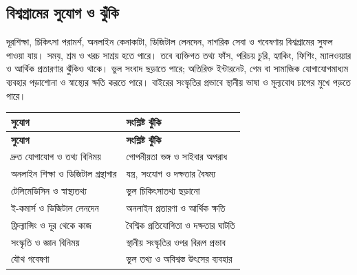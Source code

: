 \begin{topicbody}
\subsection{বিশ্বগ্রামের সুযোগ ও ঝুঁকি}
দূরশিক্ষা, চিকিৎসা পরামর্শ, অনলাইন কেনাকাটা, ডিজিটাল লেনদেন, নাগরিক সেবা ও গবেষণায় বিশ্বগ্রামের সুফল পাওয়া যায়। সময়, শ্রম ও খরচ সাশ্রয় হতে পারে। তবে ব্যক্তিগত তথ্য ফাঁস, পরিচয় চুরি, হ্যাকিং, ফিশিং, ম্যালওয়্যার ও আর্থিক প্রতারণার ঝুঁকিও থাকে। ভুল সংবাদ ছড়াতে পারে; অতিরিক্ত ইন্টারনেট, গেম বা সামাজিক যোগাযোগমাধ্যম ব্যবহার পড়াশোনা ও স্বাস্থ্যের ক্ষতি করতে পারে। বাইরের সংস্কৃতির প্রভাবে স্থানীয় ভাষা ও মূল্যবোধ চাপের মুখে পড়তে পারে।
\begin{compacttable}
\begin{longtable}{|p{}|p{}|}
\hline
\textbf{সুযোগ} & \textbf{সংশ্লিষ্ট ঝুঁকি}\\\hline
\endfirsthead
\hline\textbf{সুযোগ} & \textbf{সংশ্লিষ্ট ঝুঁকি}\\\hline\endhead
দ্রুত যোগাযোগ ও তথ্য বিনিময় & গোপনীয়তা ভঙ্গ ও সাইবার অপরাধ\\\hline
অনলাইন শিক্ষা ও ডিজিটাল গ্রন্থাগার & যন্ত্র, সংযোগ ও দক্ষতার বৈষম্য\\\hline
টেলিমেডিসিন ও স্বাস্থ্যতথ্য & ভুল চিকিৎসাতথ্য ছড়ানো\\\hline
ই-কমার্স ও ডিজিটাল লেনদেন & অনলাইন প্রতারণা ও আর্থিক ক্ষতি\\\hline
ফ্রিল্যান্সিং ও দূর থেকে কাজ & বৈশ্বিক প্রতিযোগিতা ও দক্ষতার ঘাটতি\\\hline
সংস্কৃতি ও জ্ঞান বিনিময় & স্থানীয় সংস্কৃতির ওপর বিরূপ প্রভাব\\\hline
যৌথ গবেষণা & ভুল তথ্য ও অবিশ্বস্ত উৎসের ব্যবহার\\\hline
\end{longtable}
\end{compacttable}


\end{topicbody}
